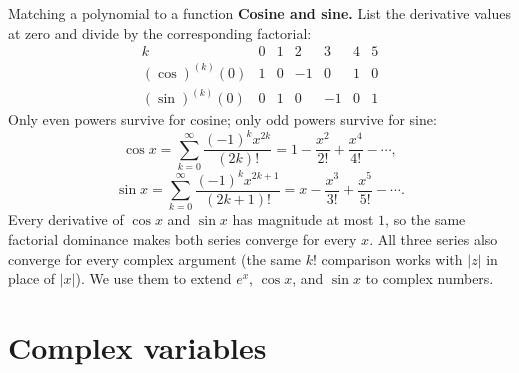 \documentclass[11pt]{beamer}
\begin{document}
\begin{frame}[allowframebreaks=1.00]{Matching a polynomial to a function}
\textbf{Cosine and sine.} List the derivative values at zero and divide by the
corresponding factorial:
\[
\begin{array}{c|rrrrrr}
 k&0&1&2&3&4&5\\ \hline
 (\cos)^{(k)}(0)&1&0&-1&0&1&0\\
 (\sin)^{(k)}(0)&0&1&0&-1&0&1
\end{array}
\]
Only even powers survive for cosine; only odd powers survive for sine:
\begin{equation}
 \cos x=\sum_{k=0}^{\infty}\frac{(-1)^k x^{2k}}{(2k)!}
 =1-\frac{x^2}{2!}+\frac{x^4}{4!}-\cdots,
 \label{eq:cos-series}
\end{equation}
\begin{equation}
 \sin x=\sum_{k=0}^{\infty}\frac{(-1)^k x^{2k+1}}{(2k+1)!}
 =x-\frac{x^3}{3!}+\frac{x^5}{5!}-\cdots.
 \label{eq:sin-series}
\end{equation}
Every derivative of $\cos x$ and $\sin x$ has magnitude at most $1$, so the same
factorial dominance makes both series converge for every $x$.
All three series also converge for every complex argument (the same $k!$ comparison works
with $|z|$ in place of $|x|$). We use them to extend
$e^x$, $\cos x$, and $\sin x$ to complex numbers.
\end{frame}

\section{Complex variables}
\end{document}
